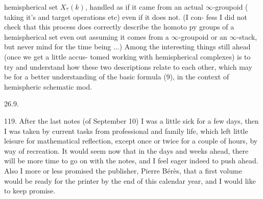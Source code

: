 
hemispherical set $X_{\underline{*}}(k)$, handled as if it came from an actual $\infty$-groupoid
( taking it's  and target operations etc) even if it does not. (I con-%
fess I did not check that this process does correctly describe the homoto\unsure{-}%
py groups of a hemispherical set\hand{,} even out assuming it comes from
a $\infty$-groupoid or an $\infty$-stack, but never mind for the time being ...)
Among the interesting things still ahead (once we get a little  accus-%
tomed working with hemispherical complexes) is to try and understand how
these two descriptions relate to each other, which may be  for 
 a better understanding of the basic formula (9), in the context of
hemispheric schematic mod.


26.9.

119. After the last notes (of September 10) I was a little sick for a
few days, then I was taken by current tasks from professional and family
life, which left little leisure for mathematical reflection, except once
or twice for a couple of hours, by way of recreation. It would seem now
that in the days and weeks ahead, there will be more time to go on with
the notes, and I feel eager indeed to push ahead. Also I more or less
promised the publisher, Pierre Bérès, that a first volume would be ready
for the printer by the end of this calendar year, and I would like to
keep promise.

